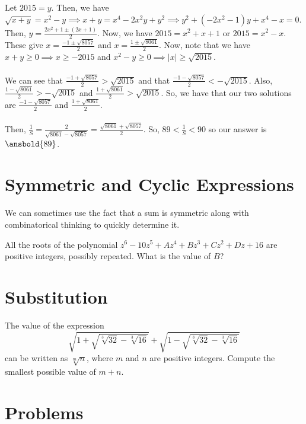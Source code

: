 \documentclass{article}
\begin{document}
\begin{sol}
Let $2015=y$. Then, we have $\sqrt{x+y}=x^2-y\implies x+y=x^4-2x^2y+y^2\implies y^2+(-2x^2-1)y+x^4-x=0$. Then, $y=\frac{2x^2+1 \pm (2x+1)}{2}$. Now, we have $2015=x^2+x+1$ or $2015=x^2-x$. These give $x=\frac{-1 \pm \sqrt{8057}}{2}$ and $x=\frac{1 \pm \sqrt{8061}}{2}$. Now, note that we have $x+y\ge 0 \implies x \ge -2015$ and $x^2-y\ge 0\implies |x|\ge \sqrt{2015}$. \\
\\
We can see that $\frac{-1 + \sqrt{8057}}{2}>\sqrt{2015}$ and that $\frac{-1-\sqrt{8057}}{2} < -\sqrt{2015}$. Also, $\frac{1-\sqrt{8061}}{2} > - \sqrt{2015}$ and $\frac{1+\sqrt{8061}}{2} > \sqrt{2015}$. So, we have that our two solutions are $\frac{-1-\sqrt{8057}}{2}$ and $\frac{1+\sqrt{8061}}{2}$. \\
\\
Then, $\frac{1}{S}=\frac{2}{\sqrt{8061}-\sqrt{8057}}=\frac{\sqrt{8061}+\sqrt{8057}}{2}$. So, $89 < \frac{1}{S} < 90$ so our answer is $\ansbold{89}$.
\end{sol}

\section{Symmetric and Cyclic Expressions}
We can sometimes use the fact that a sum is symmetric along with combinatorical thinking to quickly determine it.

\begin{exam}[AMC 10A 2021/14]
All the roots of the polynomial $z^6-10z^5+Az^4+Bz^3+Cz^2+Dz+16$ are positive integers, possibly repeated. What is the value of $B$?
\end{exam}

\section{Substitution}

\begin{exam}[NEMO 2017]
The value of the expression
$$\sqrt{1+\sqrt{\sqrt[3]{32}-\sqrt[3]{16}}} + \sqrt{1-\sqrt{\sqrt[3]{32}-\sqrt[3]{16}}}$$
can be written as $\sqrt[m]{n}$, where $m$ and $n$ are positive integers. Compute the smallest possible value of
$m + n$.
\end{exam}
\pagebreak\section{Problems}

\minpt{}
\end{document}
